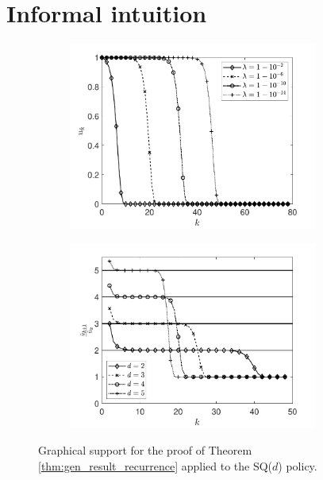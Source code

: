 \documentclass[12pt]{report}
\begin{document}
\section{Informal intuition} \label{sec:intuition_heavy}
\begin{figure}[t]
	\begin{subfigure}{.45\textwidth}
		\centering
		\captionsetup{width=.8\linewidth}
		\includegraphics[width=0.9\textwidth]{figures/Chapter5/plot_ifo_lam_tails_SQd_difflam.pdf}
		\label{fig:intuition_heavy1}
	\end{subfigure}
	\begin{subfigure}{.45\textwidth}
		\centering
		\captionsetup{width=.8\linewidth}
		\includegraphics[width=0.9\textwidth]{figures/Chapter5/plot_quotient_utilde_diffd.pdf}
		\label{fig:ultilde_verhouding}
	\end{subfigure}
	\caption{Graphical support for the proof of Theorem \ref{thm:gen_result_recurrence} applied to the SQ($d$) policy.} \label{fig:intuition_heavy}
\end{figure}
\end{document}
